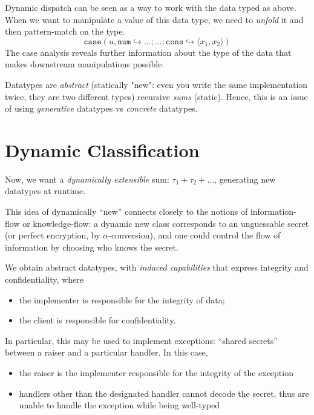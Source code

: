 \documentclass[ manuscript,screen, nonacm]{acmart}
\begin{document}
Dynamic dispatch can be seen as a way to work with the data typed as above.
When we want to manipulate a value of this data type, we need to \emph{unfold} it and
then pattern-match on the type.
\[
\mathtt{case}(u, \mathtt{num} \hookrightarrow \dots; \dots; \mathtt{cons}
  \hookrightarrow \langle x_1, x_2\rangle)
\]
The case analysis reveals further information about the type of the data that makes downstream manipulations possible.

Datatypes are \emph{abstract} (statically "new": even you write the same implementation twice, they are two different types) recursive \emph{sums} (static).
Hence, this is an issue of using \emph{generative} datatypes vs \emph{concrete} datatypes.

\section{Dynamic Classification}

Now, we want a \emph{dynamically extensible} sum: \(\tau_1 + \tau_2 + \ldots\), generating
new datatypes at runtime.

This idea of dynamically ``new'' connects closely to the notions of information-flow or 
knowledge-flow: a dynamic new class corresponds to an unguessable secret (or perfect
encryption, by \(\alpha\)-conversion), 
and one could control the flow of information by choosing who knows the secret.

We obtain abstract datatypes, with \emph{induced capabilities} that express integrity and confidentiality, where
\begin{itemize}
    \item the implementer is responsible for the integrity of data;
    \item the client is responsible for confidentiality.
\end{itemize}

In particular, this may be used to implement exceptions: ``shared secrets'' between a raiser
and a particular handler. In this case,
\begin{itemize}
    \item the raiser is the implementer responsible for the integrity of the exception
    \item handlers other than the designated handler cannot decode the secret, thus are unable to handle the exception while being well-typed
\end{itemize}
\end{document}
